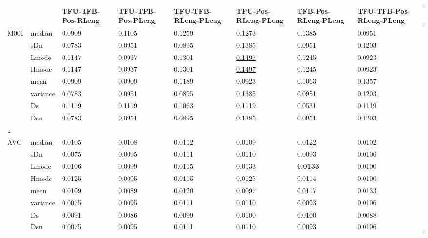\begin{tabular}{p{.5cm}p{1cm}p{1cm}p{1cm}p{1cm}p{1cm}p{1cm}p{1cm}} 
\hline \hline

 & &  TFU-TFB-Pos-RLeng & TFU-TFB-Pos-PLeng & TFU-TFB-RLeng-PLeng & TFU-Pos-RLeng-PLeng & TFB-Pos-RLeng-PLeng & TFU-TFB-Pos-RLeng-PLeng\\
\hline
\multirow{8}{*}{M001} & median & 0.0909 & 0.1105 & 0.1259 & 0.1273 & 0.1385 & 0.0951\\
& sDn & 0.0783 & 0.0951 & 0.0895 & 0.1385 & 0.0951 & 0.1203\\
& Lmode & 0.1147 & 0.0937 & 0.1301 & \underline{0.1497} & 0.1245 & 0.0923\\
& Hmode & 0.1147 & 0.0937 & 0.1301 & \underline{0.1497} & 0.1245 & 0.0923\\
& mean & 0.0909 & 0.0909 & 0.1189 & 0.0923 & 0.1063 & 0.1357\\
& variance & 0.0783 & 0.0951 & 0.0895 & 0.1385 & 0.0951 & 0.1203\\
& Ds & 0.1119 & 0.1119 & 0.1063 & 0.1119 & 0.0531 & 0.1119\\
& Dsn & 0.0783 & 0.0951 & 0.0895 & 0.1385 & 0.0951 & 0.1203\\
\hline
\ldots &  &  &  &  &  & & \\
\hline 

\multirow{8}{*}{AVG} & median & 0.0105 & 0.0108 & 0.0112 & 0.0109 & 0.0122 & 0.0102\\
& sDn & 0.0075 & 0.0095 & 0.0111 & 0.0110 & 0.0093 & 0.0106\\
& Lmode & 0.0106 & 0.0099 & 0.0115 & 0.0133 & \textbf{0.0133} & 0.0100\\
& Hmode & 0.0125 & 0.0095 & 0.0115 & 0.0125 & 0.0114 & 0.0100\\
& mean & 0.0109 & 0.0089 & 0.0120 & 0.0097 & 0.0117 & 0.0133\\
& variance & 0.0075 & 0.0095 & 0.0111 & 0.0110 & 0.0093 & 0.0106\\
& Ds & 0.0091 & 0.0086 & 0.0099 & 0.0100 & 0.0100 & 0.0088\\
& Dsn & 0.0075 & 0.0095 & 0.0111 & 0.0110 & 0.0093 & 0.0106\\
\hline \hline
\end{tabular}
